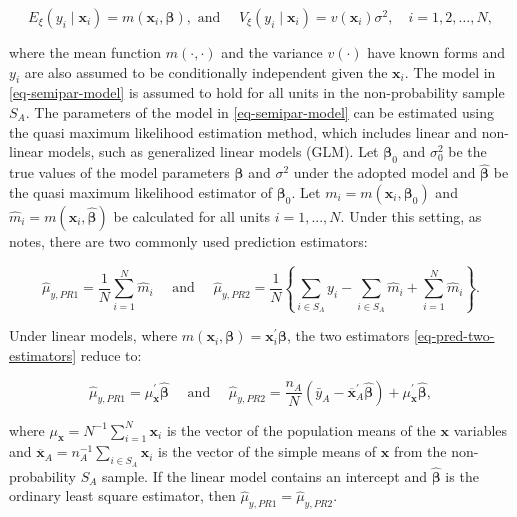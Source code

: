 \documentclass[
]{jss}
\begin{document}
\begin{equation}
E_{\xi}\left(y_i \mid \boldsymbol{x}_i\right)=m\left(\boldsymbol{x}_i, \boldsymbol{\beta}\right), \text { and } \quad V_{\xi}\left(y_i \mid \boldsymbol{x}_i\right)=v\left(\boldsymbol{x}_i\right) \sigma^2, \quad i=1,2, \ldots, N,
\label{eq-semipar-model}
\end{equation}

where the mean function \(m(\cdot,\cdot)\) and the variance \(v(\cdot)\)
have known forms and \(y_i\) are also assumed to be conditionally
independent given the \(\boldsymbol{x}_i\). The model in
\eqref{eq-semipar-model} is assumed to hold for all units in the
non-probability sample \(S_A\). The parameters of the model in
\eqref{eq-semipar-model} can be estimated using the quasi maximum
likelihood estimation method, which includes linear and non-linear
models, such as generalized linear models (GLM). Let
\(\boldsymbol{\beta}_0\) and \(\sigma^2_0\) be the true values of the
model parameters \(\boldsymbol{\beta}\) and \(\sigma^2\) under the
adopted model and \(\hat{\boldsymbol{\beta}}\) be the quasi maximum
likelihood estimator of \(\boldsymbol{\beta}_0\). Let
\(m_i=m(\boldsymbol{x}_i, \boldsymbol{\beta}_0)\) and
\(\hat{m}_i=m(\boldsymbol{x}_i, \hat{\boldsymbol{\beta}})\) be
calculated for all units \(i=1,...,N\). Under this setting, as
\citet{wu2022statistical} notes, there are two commonly used prediction
estimators:

\begin{equation}
\hat{\mu}_{y,PR1}=\frac{1}{N} \sum_{i=1}^N \hat{m}_i \quad \text { and } \quad \hat{\mu}_{y,PR2}=\frac{1}{N}\left\{\sum_{i \in S_A} y_i-\sum_{i \in S_A} \hat{m}_i+\sum_{i=1}^N \hat{m}_i\right\}.
\label{eq-pred-two-estimators}
\end{equation}

Under linear models, where
\(m(\boldsymbol{x}_i, \boldsymbol{\beta})=\boldsymbol{x}_i^{\prime}\boldsymbol{\beta}\),
the two estimators \eqref{eq-pred-two-estimators} reduce to:

\begin{equation}
\hat{\mu}_{y,PR1}=\mu_{\boldsymbol{x}}^{\prime} \hat{\boldsymbol{\beta}} \quad \text { and } \quad \hat{\mu}_{y,PR2}=\frac{n_A}{N}\left(\bar{y}_A-\overline{\boldsymbol{x}}_A^{\prime} \hat{\boldsymbol{\beta}}\right)+\mu_{\boldsymbol{x}}^{\prime} \hat{\boldsymbol{\beta}},
\label{eq-pred-two-estimators-simplified}
\end{equation}

where \(\mu_{\boldsymbol{x}} = N^{-1}\sum_{i=1}^N\boldsymbol{x}_i\) is
the vector of the population means of the \(\boldsymbol{x}\) variables
and
\(\overline{\boldsymbol{x}}_A=n_A^{-1}\sum_{i \in S_A}\boldsymbol{x}_i\)
is the vector of the simple means of \(\boldsymbol{x}\) from the
non-probability \(S_A\) sample. If the linear model contains an
intercept and \(\hat{\boldsymbol{\beta}}\) is the ordinary least square
estimator, then \(\hat{\mu}_{y,PR1}=\hat{\mu}_{y,PR2}\).
\end{document}
